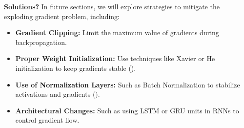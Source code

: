 \begin{deepeningbox}
    \highspace
    \textcolor{Green3}{ \textbf{Solutions?}} In future sections, we will explore strategies to mitigate the exploding gradient problem, including:
    \begin{itemize}
        \item \textbf{Gradient Clipping:} Limit the maximum value of gradients during backpropagation.
        \item \textbf{Proper Weight Initialization:} Use techniques like Xavier or He initialization to keep gradients stable ().
        \item \textbf{Use of Normalization Layers:} Such as Batch Normalization to stabilize activations and gradients ().
        \item \textbf{Architectural Changes:} Such as using LSTM or GRU units in RNNs to control gradient flow.
    \end{itemize}
\end{deepeningbox}